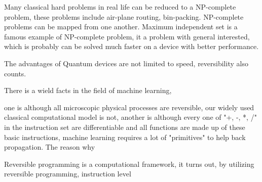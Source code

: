 \documentclass[]{article}
\begin{document}
Many classical hard problems in real life can be reduced to a NP-complete problem, these problems include air-plane routing, bin-packing. NP-complete problems can be mapped from one another.
Maximum independent set is a famous example of NP-complete problem, it a problem with general interested, which is probably can be solved much faster on a device with better performance.

The advantages of Quantum devices are not limited to speed, reversibility also counts.

There is a wield facts in the field of machine learning,

one is although all microscopic physical processes are reversible, our widely used classical computational model is not, another is although every one of "+, -, *, /" in the instruction set are differentiable and all functions are made up of these basic instructions, machine learning requires a lot of "primitives" to help back propagation. The reason why

Reversible programming is a computational framework, it turns out, by utilizing reversible programming, instruction level 
\end{document}
